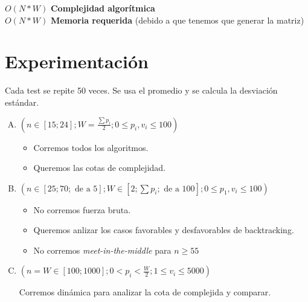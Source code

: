 \documentclass[fleqn, 11pt]{article}
\begin{document}
\small $O(N * W)$ \textbf{Complejidad algorítmica} \\
\small $O(N * W)$ \textbf{Memoria requerida}
(debido a que tenemos que generar la matriz)

\section{Experimentación}

Cada test se repite 50 veces. Se usa el promedio y se calcula la desviación
estándar.

\begin{enumerate}[A.]
\item $(n \in [15; 24];
	W=\frac{\sum p_i}{2};
	0 \leq p_i, v_i \leq 100)$

\begin{itemize}
\item Corremos todos los algoritmos.
\item Queremos las cotas de complejidad.
\end{itemize}

\item $(n \in [25; 70; \text{ de a } 5];
	W \in [2; \sum p_i; \text{ de a } 100];
	0 \leq p_1, v_i \leq 100)$

\begin{itemize}
\item No corremos fuerza bruta.
\item Queremos anlizar los casos favorables y desfavorables de backtracking.
\item No corremos \emph{meet-in-the-middle} para $n \geq 55$
\end{itemize}

\item $(n = W \in [100; 1000];
        0 < p_i < \frac{W}{2};
        1 \leq v_i \leq 5000)$

Corremos dinámica para analizar la cota de complejida y comparar.
\end{enumerate}
\end{document}
